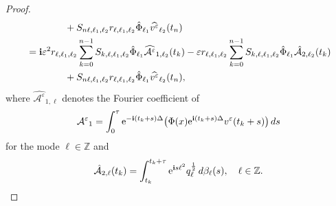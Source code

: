 \documentclass[a4paper]{amsart}
\begin{document}
\begin{proof}
\begin{align*}
&\qquad\qquad +S_{n\ell,\ell_1,\ell_2}r_{\ell,\ell_1,\ell_2}\hat{\Phi}_{\ell_1}\widehat{v^\varepsilon}_{\ell_2}(t_n)\\
&={\bf i}\varepsilon^2 r_{\ell,\ell_1,\ell_2}\sum_{k=0}^{n-1}S_{k,\ell,\ell_1,\ell_2}\hat{\Phi}_{\ell_1}\widehat{\mathcal{A}^\varepsilon}_{1,\ell_2}(t_k)-\varepsilon 
r_{\ell,\ell_1,\ell_2}\sum_{k=0}^{n-1}S_{k,\ell,\ell_1,\ell_2}\hat{\Phi}_{\ell_1}\hat{\mathcal{A}}_{2,\ell_2}(t_k)\\
&\qquad\qquad +S_{n\ell,\ell_1,\ell_2}r_{\ell,\ell_1,\ell_2}\hat{\Phi}_{\ell_1}\widehat{v^\varepsilon}_{\ell_2}(t_n),
\end{align*}
where $\widehat{\mathcal{A}^\varepsilon}_{1,\ell}$ denotes the Fourier coefficient of
$$
\mathcal{A^\varepsilon}_1=\int_0^\tau {\rm e}^{-{\bf i}(t_k+s)\Delta}\big( \Phi(x){\rm e}^{{\bf i}(t_k+s)\Delta}v^\varepsilon(t_k+s)\big) \,ds
$$
for the mode $\ell\in\mathbb{Z}$ and 
$$
\mathcal{\hat{A}}_{2,\ell}(t_k)=\int_{t_k}^{t_k+\tau}{\rm e}^{{\bf i}s \ell^2} q_\ell^{\frac{1}{2}}\,d\beta_\ell(s), \quad \ell\in\mathbb{Z}.
$$ 

\end{proof}
\end{document}
